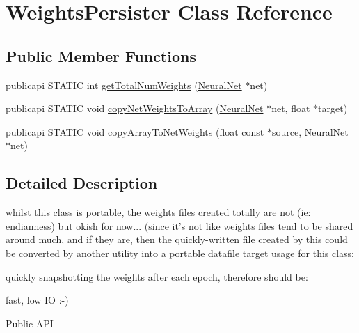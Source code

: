 \hypertarget{classWeightsPersister}{\section{Weights\-Persister Class Reference}
\label{classWeightsPersister}
}
\subsection*{Public Member Functions}
\begin{DoxyCompactItemize}
\item 
publicapi S\-T\-A\-T\-I\-C int \hyperlink{classWeightsPersister_a5ec7638ead9249b696f60e39e47accd9}{get\-Total\-Num\-Weights} (\hyperlink{classNeuralNet}{Neural\-Net} $\ast$net)
\item 
publicapi S\-T\-A\-T\-I\-C void \hyperlink{classWeightsPersister_a73c796f8e7e64c040aa5fe3c9e4f32ef}{copy\-Net\-Weights\-To\-Array} (\hyperlink{classNeuralNet}{Neural\-Net} $\ast$net, float $\ast$target)
\item 
publicapi S\-T\-A\-T\-I\-C void \hyperlink{classWeightsPersister_a454a65b2a8ad6c04f8b95533c3f9416c}{copy\-Array\-To\-Net\-Weights} (float const $\ast$source, \hyperlink{classNeuralNet}{Neural\-Net} $\ast$net)
\end{DoxyCompactItemize}


\subsection{Detailed Description}
whilst this class is portable, the weights files created totally are not (ie\-: endianness) but okish for now... (since it's not like weights files tend to be shared around much, and if they are, then the quickly-\/written file created by this could be converted by another utility into a portable datafile target usage for this class\-:
\begin{DoxyItemize}
\item quickly snapshotting the weights after each epoch, therefore should be\-:
\begin{DoxyItemize}
\item fast, low I\-O \-:-\/) \begin{DoxyParagraph}{Public A\-P\-I}

\end{DoxyParagraph}

\end{DoxyItemize}
\end{DoxyItemize}

